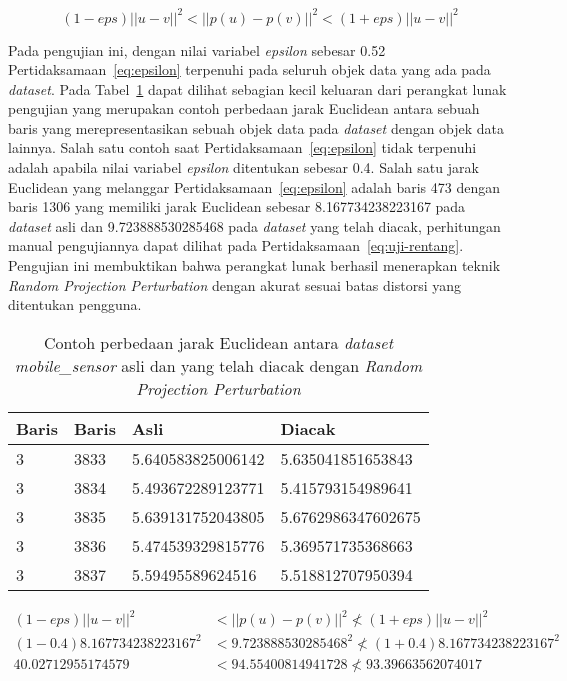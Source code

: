 \begin{equation}\label{eq:epsilon}
	(1-eps)||u - v||^{2}<||p(u) - p(v)||^{2}<(1+eps)||u - v||^{2}
\end{equation}

Pada pengujian ini, dengan nilai variabel \textit{epsilon} sebesar 0.52 Pertidaksamaan~\ref{eq:epsilon} terpenuhi pada seluruh objek data yang ada pada \textit{dataset}. Pada Tabel~\ref{table:uji-projection} dapat dilihat sebagian kecil keluaran dari perangkat lunak pengujian yang merupakan contoh perbedaan jarak Euclidean antara sebuah baris yang merepresentasikan sebuah objek data pada \textit{dataset} dengan objek data lainnya. Salah satu contoh saat Pertidaksamaan~\ref{eq:epsilon} tidak terpenuhi adalah apabila nilai variabel \textit{epsilon} ditentukan sebesar 0.4. Salah satu jarak Euclidean yang melanggar Pertidaksamaan~\ref{eq:epsilon} adalah baris 473 dengan baris 1306 yang memiliki jarak Euclidean sebesar 8.167734238223167 pada \textit{dataset} asli dan 9.723888530285468 pada \textit{dataset} yang telah diacak, perhitungan manual pengujiannya dapat dilihat pada Pertidaksamaan~\ref{eq:uji-rentang}. Pengujian ini membuktikan bahwa perangkat lunak berhasil menerapkan teknik \textit{Random Projection Perturbation} dengan akurat sesuai batas distorsi yang ditentukan pengguna.

\begin{table}
	\centering
	\caption{Contoh perbedaan jarak Euclidean antara \textit{dataset mobile\_sensor} asli dan yang telah diacak dengan \textit{Random Projection Perturbation}}
	\begin{tabular}{ll|ll}
		\hline
		Baris&Baris&Asli&Diacak \\ \hline
		3&3833&5.640583825006142&5.635041851653843\\
		3&3834&5.493672289123771&5.415793154989641\\
		3&3835&5.639131752043805&5.6762986347602675\\
		3&3836&5.474539329815776&5.369571735368663\\
		3&3837&5.59495589624516&5.518812707950394\\
		\hline
	\end{tabular}
	\label{table:uji-projection}
\end{table}

\begin{align}
	(1-eps)||u - v||^{2}&<||p(u) - p(v)||^{2}\nless(1+eps)||u - v||^{2} \label{eq:uji-rentang} \\
	(1-0.4)8.167734238223167^{2}&<9.723888530285468^{2}\nless(1+0.4)8.167734238223167^{2} \nonumber \\
	40.02712955174579 &< 94.55400814941728 \nless 93.39663562074017 \nonumber
\end{align}

